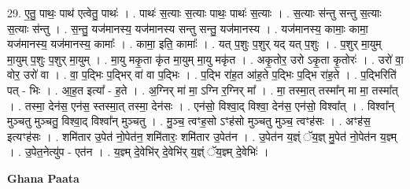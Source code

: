 \documentclass[17pt]{extarticle}
\begin{document}
29. ए॒तु॒ पाथः॒ पाथ॑ एत्वेतु॒ पाथः॑ । . पाथः॑ स॒त्याः स॒त्याः पाथः॒ पाथः॑ स॒त्याः । . स॒त्याः स॑न्तु सन्तु स॒त्याः स॒त्याः स॑न्तु । . स॒न्तु॒ यज॑मानस्य॒ यज॑मानस्य सन्तु सन्तु॒ यज॑मानस्य । . यज॑मानस्य॒ कामाः॒ कामा॒ यज॑मानस्य॒ यज॑मानस्य॒ कामाः᳚ । . कामा॒ इति॒ कामाः᳚ । . यत् प॒शुः प॒शुर् यद् यत् प॒शुः । . प॒शुर् मा॒युम् मा॒युम् प॒शुः प॒शुर् मा॒युम् । . मा॒यु मकृ॒ता कृ॑त मा॒युम् मा॒यु मकृ॑त । . अकृ॒तोर॒ उरो ऽकृ॒ता कृ॒तोरः॑ । . उरो॑ वा॒ वोर॒ उरो॑ वा । . वा॒ प॒द्भिः प॒द्भिर् वा॑ वा प॒द्भिः । . प॒द्भि रा॑ह॒त आ॑ह॒ते प॒द्भिः प॒द्भि रा॑ह॒ते । . प॒द्भिरिति॑ पत् - भिः । . आ॒ह॒त इत्या᳚ - ह॒ते । . अ॒ग्निर् मा॑ मा॒ ऽग्नि र॒ग्निर् मा᳚ । . मा॒ तस्मा॒त् तस्मा᳚न् मा मा॒ तस्मा᳚त् । . तस्मा॒ देन॑स॒ एन॑स॒ स्तस्मा॒त् तस्मा॒ देन॑सः । . एन॑सो॒ विश्वा॒द् विश्वा॒ देन॑स॒ एन॑सो॒ विश्वा᳚त् । . विश्वा᳚न् मुञ्चतु मुञ्चतु॒ विश्वा॒द् विश्वा᳚न् मुञ्चतु । . मु॒ञ्च॒ त्वꣳह॒सो ऽꣳह॑सो मुञ्चतु मुञ्च॒ त्वꣳह॑सः । . अꣳह॑स॒ इत्यꣳह॑सः । . शमि॑तार उ॒पेत॑ नो॒पेत॑न॒ शमि॑तारः॒ शमि॑तार उ॒पेत॑न । . उ॒पेत॑न य॒ज्ञ्ं ॅय॒ज्ञ् मु॒पेत॑ नो॒पेत॑न य॒ज्ञ्म् । . उ॒पेत॒नेत्यु॑प - एत॑न । . य॒ज्ञ्म् दे॒वेभि॑र् दे॒वेभि॑र् य॒ज्ञ्ं ॅय॒ज्ञ्म् दे॒वेभिः॑ । \newline

\textbf{Ghana Paata } \newline
\end{document}
